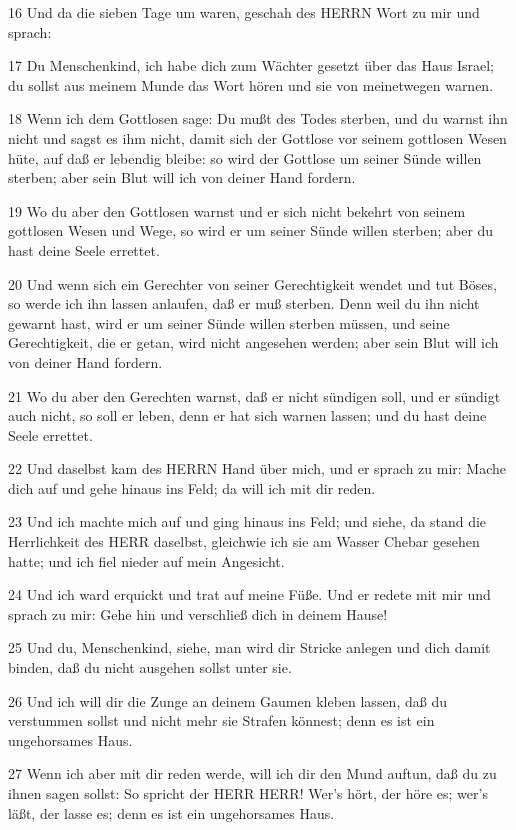 \par 16 Und da die sieben Tage um waren, geschah des HERRN Wort zu mir und sprach:
\par 17 Du Menschenkind, ich habe dich zum Wächter gesetzt über das Haus Israel; du sollst aus meinem Munde das Wort hören und sie von meinetwegen warnen.
\par 18 Wenn ich dem Gottlosen sage: Du mußt des Todes sterben, und du warnst ihn nicht und sagst es ihm nicht, damit sich der Gottlose vor seinem gottlosen Wesen hüte, auf daß er lebendig bleibe: so wird der Gottlose um seiner Sünde willen sterben; aber sein Blut will ich von deiner Hand fordern.
\par 19 Wo du aber den Gottlosen warnst und er sich nicht bekehrt von seinem gottlosen Wesen und Wege, so wird er um seiner Sünde willen sterben; aber du hast deine Seele errettet.
\par 20 Und wenn sich ein Gerechter von seiner Gerechtigkeit wendet und tut Böses, so werde ich ihn lassen anlaufen, daß er muß sterben. Denn weil du ihn nicht gewarnt hast, wird er um seiner Sünde willen sterben müssen, und seine Gerechtigkeit, die er getan, wird nicht angesehen werden; aber sein Blut will ich von deiner Hand fordern.
\par 21 Wo du aber den Gerechten warnst, daß er nicht sündigen soll, und er sündigt auch nicht, so soll er leben, denn er hat sich warnen lassen; und du hast deine Seele errettet.
\par 22 Und daselbst kam des HERRN Hand über mich, und er sprach zu mir: Mache dich auf und gehe hinaus ins Feld; da will ich mit dir reden.
\par 23 Und ich machte mich auf und ging hinaus ins Feld; und siehe, da stand die Herrlichkeit des HERR daselbst, gleichwie ich sie am Wasser Chebar gesehen hatte; und ich fiel nieder auf mein Angesicht.
\par 24 Und ich ward erquickt und trat auf meine Füße. Und er redete mit mir und sprach zu mir: Gehe hin und verschließ dich in deinem Hause!
\par 25 Und du, Menschenkind, siehe, man wird dir Stricke anlegen und dich damit binden, daß du nicht ausgehen sollst unter sie.
\par 26 Und ich will dir die Zunge an deinem Gaumen kleben lassen, daß du verstummen sollst und nicht mehr sie Strafen könnest; denn es ist ein ungehorsames Haus.
\par 27 Wenn ich aber mit dir reden werde, will ich dir den Mund auftun, daß du zu ihnen sagen sollst: So spricht der HERR HERR! Wer's hört, der höre es; wer's läßt, der lasse es; denn es ist ein ungehorsames Haus.

